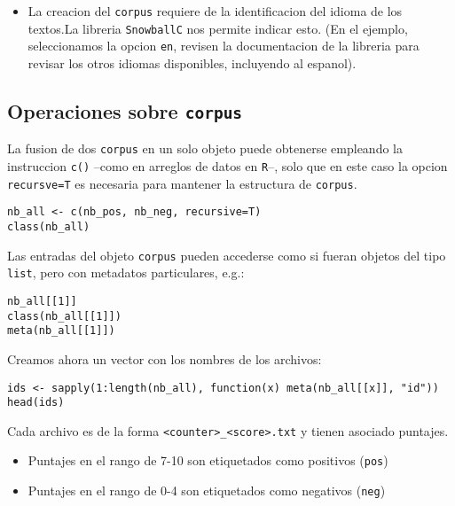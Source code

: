 \documentclass[11pt,]{article}
\providecommand{\tightlist}{%
\setlength{\itemsep}{0pt}\setlength{\parskip}{0pt}}
\begin{document}
\begin{itemize}
\tightlist
\item
  La creacion del \texttt{corpus} requiere de la identificacion del
  idioma de los textos.La libreria \texttt{SnowballC} nos permite
  indicar esto. (En el ejemplo, seleccionamos la opcion \texttt{en},
  revisen la documentacion de la libreria para revisar los otros idiomas
  disponibles, incluyendo al espanol).
\end{itemize}

\subsection{\texorpdfstring{Operaciones sobre
\texttt{corpus}}{Operaciones sobre corpus}}\label{operaciones-sobre-corpus}

La fusion de dos \texttt{corpus} en un solo objeto puede obtenerse
empleando la instruccion \texttt{c()} --como en arreglos de datos en
\texttt{R}--, solo que en este caso la opcion \texttt{recursve=T} es
necesaria para mantener la estructura de \texttt{corpus}.

\begin{verbatim}
nb_all <- c(nb_pos, nb_neg, recursive=T)
class(nb_all)
\end{verbatim}

Las entradas del objeto \texttt{corpus} pueden accederse como si fueran
objetos del tipo \texttt{list}, pero con metadatos particulares, e.g.:

\begin{verbatim}
nb_all[[1]]
class(nb_all[[1]])
meta(nb_all[[1]])
\end{verbatim}

Creamos ahora un vector con los nombres de los archivos:

\begin{verbatim}
ids <- sapply(1:length(nb_all), function(x) meta(nb_all[[x]], "id"))
head(ids)
\end{verbatim}

Cada archivo es de la forma
\texttt{\textless{}counter\textgreater{}\_\textless{}score\textgreater{}.txt}
y tienen asociado puntajes.

\begin{itemize}
\item
  Puntajes en el rango de 7-10 son etiquetados como positivos
  (\texttt{pos})
\item
  Puntajes en el rango de 0-4 son etiquetados como negativos
  (\texttt{neg})
\end{itemize}
\end{document}
